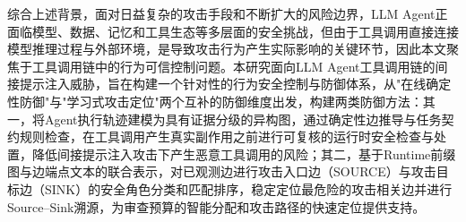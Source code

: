 综合上述背景，面对日益复杂的攻击手段和不断扩大的风险边界，LLM Agent正面临模型、数据、记忆和工具生态等多层面的安全挑战，但由于工具调用直接连接模型推理过程与外部环境，是导致攻击行为产生实际影响的关键环节，因此本文聚焦于工具调用链中的行为可信控制问题。本研究面向LLM Agent工具调用链的间接提示注入威胁，旨在构建一个针对性的行为安全控制与防御体系，从"在线确定性防御"与"学习式攻击定位"两个互补的防御维度出发，构建两类防御方法：其一，将Agent执行轨迹建模为具有证据分级的异构图，通过确定性边推导与任务契约规则检查，在工具调用产生真实副作用之前进行可复核的运行时安全检查与处置，降低间接提示注入攻击下产生恶意工具调用的风险；其二，基于Runtime前缀图与边端点文本的联合表示，对已观测边进行攻击入口边（SOURCE）与攻击目标边（SINK）的安全角色分类和匹配排序，稳定定位最危险的攻击相关边并进行Source--Sink溯源，为审查预算的智能分配和攻击路径的快速定位提供支持。
